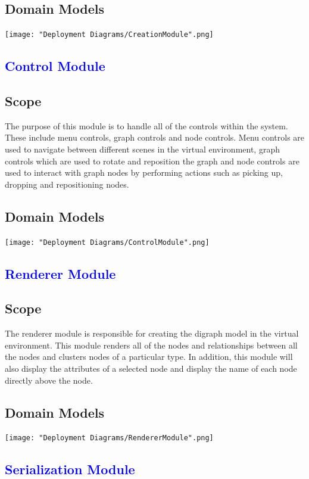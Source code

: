 \documentclass[12pt]{article}
\begin{document}
\subsection{Domain Models}

\texttt{[image: "Deployment Diagrams/CreationModule".png]}

\textcolor{blue}{\section{Control Module}}
\subsection{Scope}
The purpose of this module is to handle all of the controls within the system. These include menu controls, graph controls and node controls. Menu controls are used to navigate between different scenes in the virtual environment, graph controls which are used to rotate and reposition the graph and node controls are used to interact with graph nodes by performing actions such as picking up, dropping and repositioning nodes. 
\subsection{Domain Models}

\texttt{[image: "Deployment Diagrams/ControlModule".png]}

\textcolor{blue}{\section{Renderer Module}}
\subsection{Scope}
The renderer module is responsible for creating the digraph model in the virtual environment. This module renders all of the nodes and relationships between all the nodes and clusters nodes of a particular type. In addition, this module will also display the attributes of a selected node and display the name of each node directly above the node. 
\subsection{Domain Models}

\texttt{[image: "Deployment Diagrams/RendererModule".png]}

\textcolor{blue}{\section{Serialization Module}}
\end{document}

